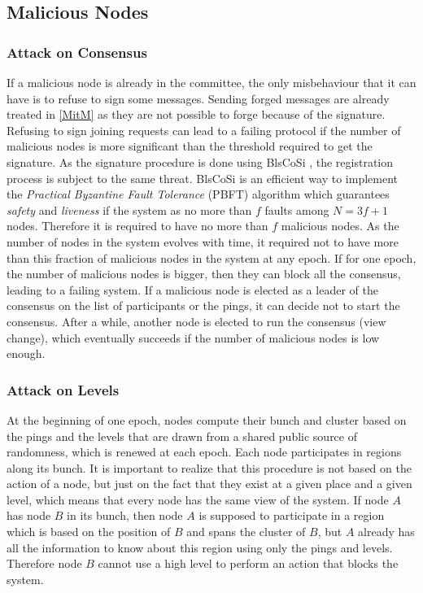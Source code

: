 \documentclass[a4paper,11pt,twoside=semi,openright]{report}
\begin{document}
\subsection{Malicious Nodes}
\subsubsection{Attack on Consensus} If a malicious node is already in the
committee, the only misbehaviour that it can have is to refuse to sign some
messages. Sending forged messages are already treated in \autoref{MitM} as they
are not possible to forge because of the signature. Refusing to sign joining
requests can lead to a failing protocol if the number of malicious nodes is
more significant than the threshold required to get the signature. As the
signature procedure is done using BlsCoSi \cite{Boneh2018}, the registration
process is subject to the same threat. BlsCoSi \cite{Boneh2018} is an efficient
way to implement the \textit{Practical Byzantine Fault Tolerance} (PBFT)
\cite{Castro1999} algorithm which guarantees \textit{safety} and
\textit{liveness} if the system as no more than $f$ faults among $N = 3f+1$
nodes. Therefore it is required to have no more than $f$ malicious nodes. As
the number of nodes in the system evolves with time, it required not to have
more than this fraction of malicious nodes in the system at any epoch. If for
one epoch, the number of malicious nodes is bigger, then they can block all the
consensus, leading to a failing system.  If a malicious node is elected as a
leader of the consensus on the list of participants or the pings, it can decide
not to start the consensus. After a while, another node is elected to run the
consensus (view change), which eventually succeeds if the number of malicious
nodes is low enough.

\subsubsection{Attack on Levels} \label{sec:ControlePlane-Threat-Model}
At the beginning of one epoch, nodes compute their bunch and cluster based on
the pings and the levels that are drawn from a shared public source of
randomness, which is renewed at each epoch. Each node participates in regions
along its bunch. It is important to realize that this procedure is not based on
the action of a node, but just on the fact that they exist at a given place and
a given level, which means that every node has the same view of the system. If
node $A$ has node $B$ in its bunch, then node $A$ is supposed to participate in
a region which is based on the position of $B$ and spans the cluster of $B$,
but $A$ already has all the information to know about this region using only
the pings and levels. Therefore node $B$ cannot use a high level to perform an
action that blocks the system. 
\end{document}
